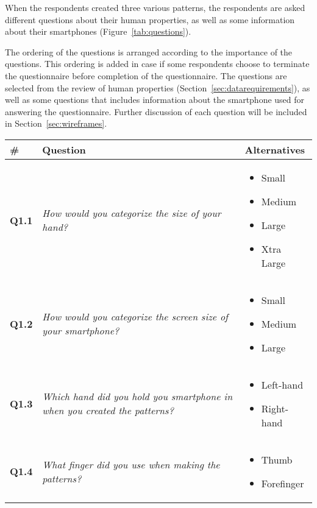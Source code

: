     When the respondents created three various patterns, the respondents are asked different questions about their human properties, as well as some information about their smartphones (Figure~\ref{tab:questions}). 

    The ordering of the questions is arranged according to the importance of the questions. This ordering is added in case if some respondents choose to terminate the questionnaire before completion of the questionnaire. The questions are selected from the review of human properties (Section~\ref{sec:datarequirements}), as well as some questions that includes information about the smartphone used for answering the questionnaire. Further discussion of each question will be included in Section~\ref{sec:wireframes}.

    \begin{longtable}{| p{1cm} | m{6.5cm} | m{3.5cm} |}
      \hline
      {\bf \#} & {\bf Question} & {\bf Alternatives} \\ \hline
      {\bf Q1.1} & 
      {\it How would you categorize the size of your hand?} & 
      \begin{itemize}
        \item Small
        \item Medium
        \item Large
        \item Xtra Large
      \end{itemize} 
      \\ \hline

      {\bf Q1.2} & 
      {\it How would you categorize the screen size of your smartphone?} &
      \begin{itemize}
        \item Small
        \item Medium
        \item Large
      \end{itemize} 
      \\ \hline

      {\bf Q1.3} & 
      {\it Which hand did you hold you smartphone in when you created the patterns?} & 
      \begin{itemize}
        \item Left-hand
        \item Right-hand
      \end{itemize} \\ \hline

      {\bf Q1.4} & 
      {\it What finger did you use when making the patterns?} &
      \begin{itemize}
        \item Thumb
        \item Forefinger
      \end{itemize}  \\ \hline


\end{longtable}
